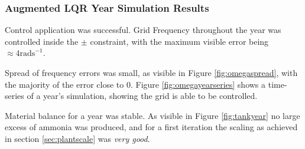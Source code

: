 \subsubsection{Augmented LQR Year Simulation Results}

Control application was successful.
Grid Frequency throughout the year was controlled inside the $\pm$ constraint, with the maximum visible error being $\approx 4 \text{rads}^{-1}$.

Spread of frequency errors was small, as visible in Figure \ref{fig:omegaspread}, with the majority of the error close to 0.
Figure \ref{fig:omegayearseries} shows a time-series of a year's simulation, showing the grid is able to be controlled.

Material balance for a year was stable.
As visible in Figure \ref{fig:tankyear} no large excess of ammonia was produced, and for a first iteration the scaling as achieved in section \ref{sec:plantscale} was \emph{very good}.






